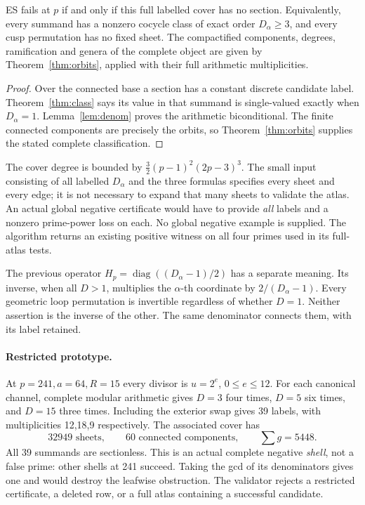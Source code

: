 \begin{theorem}\label{thm:failure}
ES fails at $p$ if and only if this full labelled cover has no section.
Equivalently, every summand has a nonzero cocycle class of exact order
$D_\alpha\ge3$, and every cusp permutation has no fixed sheet.
The compactified components, degrees, ramification and genera of the
complete object are given by Theorem~\ref{thm:orbits}, applied with their
full arithmetic multiplicities.
\end{theorem}
\begin{proof}
Over the connected base a section has a constant discrete candidate label.
Theorem~\ref{thm:class} says its value in that summand is single-valued
exactly when $D_\alpha=1$. Lemma~\ref{lem:denom} proves the arithmetic
biconditional. The finite connected components are precisely the orbits,
so Theorem~\ref{thm:orbits} supplies the stated complete classification.
\end{proof}

The cover degree is bounded by
$\tfrac32(p-1)^2(2p-3)^3$. The small input consisting of all labelled
$D_\alpha$ and the three formulas specifies every sheet and every edge;
it is not necessary to expand that many sheets to validate the atlas.
An actual global negative certificate would have to provide \emph{all}
labels and a nonzero prime-power loss on each. No global negative example
is supplied. The algorithm returns an existing positive witness on all
four primes used in its full-atlas tests.

The previous operator $H_p=\operatorname{diag}((D_\alpha-1)/2)$ has a
separate meaning. Its inverse, when all $D>1$, multiplies the $\alpha$-th
coordinate by $2/(D_\alpha-1)$. Every geometric loop permutation is
invertible regardless of whether $D=1$. Neither assertion is the inverse
of the other. The same denominator connects them, with its label retained.

\paragraph{Restricted prototype.}
At $p=241,a=64,R=15$ every divisor is $u=2^e$, $0\le e\le12$.
For each canonical channel, complete modular arithmetic gives
$D=3$ four times, $D=5$ six times, and $D=15$ three times.
Including the exterior swap gives 39 labels, with multiplicities
12,18,9 respectively. The associated cover has
\[
 32949\text{ sheets},\qquad60\text{ connected components},\qquad
 \sum g=5448.
\]
All 39 summands are sectionless. This is an actual complete negative
\emph{shell}, not a false prime: other shells at 241 succeed.
Taking the gcd of its denominators gives one and would destroy the
leafwise obstruction. The validator rejects a restricted certificate,
a deleted row, or a full atlas containing a successful candidate.


